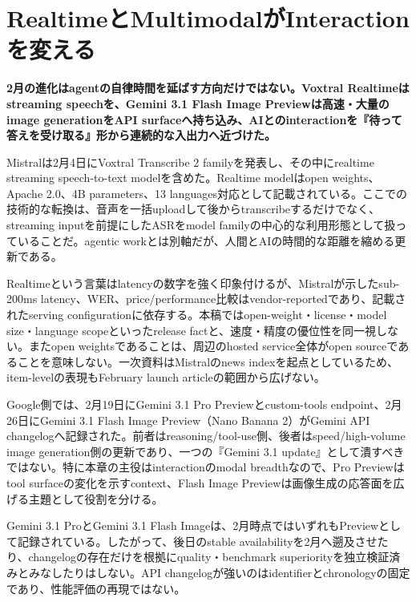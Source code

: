 \section{RealtimeとMultimodalがInteractionを変える}
\noindent\textbf{2月の進化はagentの自律時間を延ばす方向だけではない。Voxtral Realtimeはstreaming speechを、Gemini 3.1 Flash Image Previewは高速・大量のimage generationをAPI surfaceへ持ち込み、AIとのinteractionを『待って答えを受け取る』形から連続的な入出力へ近づけた。}\autocite{src-a24fd97eb3d0,src-d8b7c1c36830}

Mistralは2月4日にVoxtral Transcribe 2 familyを発表し、その中にrealtime streaming speech-to-text modelを含めた。Realtime modelはopen weights、Apache 2.0、4B parameters、13 languages対応として記載されている。ここでの技術的な転換は、音声を一括uploadして後からtranscribeするだけでなく、streaming inputを前提にしたASRをmodel familyの中心的な利用形態として扱っていることだ。agentic workとは別軸だが、人間とAIの時間的な距離を縮める更新である。\autocite{src-d8b7c1c36830}


\begin{claimboundary}
Realtimeという言葉はlatencyの数字を強く印象付けるが、Mistralが示したsub-200ms latency、WER、price/performance比較はvendor-reportedであり、記載されたserving configurationに依存する。本稿ではopen-weight・license・model size・language scopeといったrelease factと、速度・精度の優位性を同一視しない。またopen weightsであることは、周辺のhosted service全体がopen sourceであることを意味しない。一次資料はMistralのnews indexを起点としているため、item-levelの表現もFebruary launch articleの範囲から広げない。\autocite{src-d8b7c1c36830}
\end{claimboundary}

Google側では、2月19日にGemini 3.1 Pro Previewとcustom-tools endpoint、2月26日にGemini 3.1 Flash Image Preview（Nano Banana 2）がGemini API changelogへ記録された。前者はreasoning/tool-use側、後者はspeed/high-volume image generation側の更新であり、一つの『Gemini 3.1 update』として潰すべきではない。特に本章の主役はinteractionのmodal breadthなので、Pro Previewはtool surfaceの変化を示すcontext、Flash Image Previewは画像生成の応答面を広げる主題として役割を分ける。\autocite{src-a24fd97eb3d0}


\begin{claimboundary}
Gemini 3.1 ProとGemini 3.1 Flash Imageは、2月時点ではいずれもPreviewとして記録されている。したがって、後日のstable availabilityを2月へ遡及させたり、changelogの存在だけを根拠にquality・benchmark superiorityを独立検証済みとみなしたりはしない。API changelogが強いのはidentifierとchronologyの固定であり、性能評価の再現ではない。\autocite{src-a24fd97eb3d0}
\end{claimboundary}

